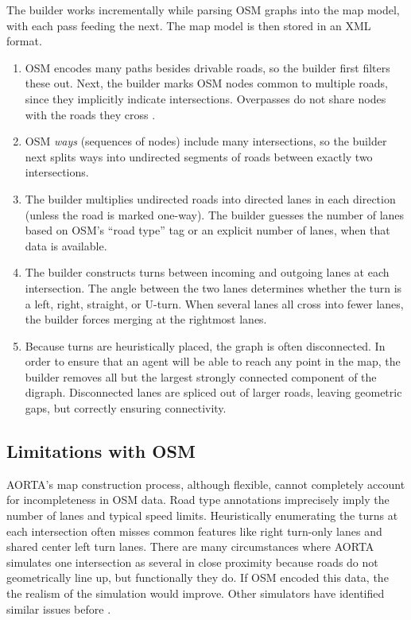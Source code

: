 \documentclass[letterpaper, 10 pt, conference]{ieeeconf}  %
\begin{document}
The builder works incrementally while parsing OSM graphs into the map model,
with each pass feeding the next. The map model is then stored in an XML format.
\begin{enumerate}
  \item OSM encodes many paths besides drivable roads, so the builder first filters
        these out. Next, the builder marks OSM nodes common to multiple roads, since
        they implicitly indicate intersections. Overpasses do not share nodes
        with the roads they cross \cite{osmOverpass}.
  \item OSM \emph{ways} (sequences of nodes) include many
        intersections, so the builder next splits ways into undirected
        segments of roads between exactly two intersections.
  \item The builder multiplies undirected roads into directed lanes in each
        direction (unless the road is marked one-way). The builder guesses the
        number of lanes based on OSM's ``road type'' tag or an explicit number of
        lanes, when that data is available.
  \item The builder constructs turns between incoming and outgoing lanes at each
        intersection. The angle between the two lanes determines whether the turn is
        a left, right, straight, or U-turn. When several lanes all cross into fewer
        lanes, the builder forces merging at the rightmost lanes. 
  \item Because turns are heuristically placed, the graph is often disconnected.
        In order to ensure that an agent will be able to reach any point in the map,
        the builder removes all but the largest strongly connected component of the
        digraph. Disconnected lanes are spliced out of larger roads, leaving
        geometric gaps, but correctly ensuring connectivity.
\end{enumerate}

\subsection{Limitations with OSM}
\label{sec:osmlimits}

AORTA's map construction process, although flexible, cannot completely account
for incompleteness in OSM data. Road type annotations imprecisely imply the
number of lanes and typical speed limits. Heuristically enumerating the turns at
each intersection often misses common features like right turn-only lanes and
shared center left turn lanes. There are many circumstances where AORTA
simulates one intersection as several in close proximity because roads do not
geometrically line up, but functionally they do. If OSM encoded this data, the
the realism of the simulation would improve. Other simulators have identified
similar issues before \cite{Krajzewicz_Hertkorn_Ringel_Wagner_2005}.
\end{document}
